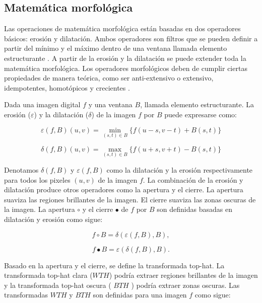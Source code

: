 \subsection{Matem\'atica morfol\'ogica}

Las operaciones de matemática morfológica están basadas en dos operadores básicos: erosión y dilatación. Ambos operadores son filtros que se pueden definir a partir del m\'inimo y el m\'aximo dentro de una ventana llamada elemento estructurante \cite{serra1986introduction}. A partir de la erosi\'on y la dilataci\'on se puede extender toda la matem\'atica morfol\'ogica. Los operadores morfol\'ogicos deben de cumplir ciertas propiedades de manera teórica, como ser anti-extensivo o extensivo, idempotentes, homot\'opicos y crecientes \cite{serra1986introduction}.

Dada una imagen digital $f$ y una ventana $B$, llamada elemento estructurante. La erosi\'on ($\varepsilon$) y la dilataci\'on ($\delta$) de la imagen $f$ por $B$ puede expresarse como:

\begin{equation}
\varepsilon(f,B)(u,v)  = \min_{(s,t) \in B} \{f(u-s,v-t) + B(s,t) \}
\end{equation}

\begin{equation}
\delta(f,B)(u,v)  =  \max_{(s,t) \in B} \{f(u+s,v+t) - B(s,t) \}
\end{equation}

Denotamos $\delta(f,B)$ y $\varepsilon(f,B)$ como la dilataci\'on y la erosi\'on respectivamente para todos los pixeles $(u,v)$ de la imagen $f$. La combinación de la erosión y dilatación produce otros operadores como la apertura y el cierre. La apertura suaviza las regiones brillantes de la imagen. El cierre suaviza las zonas oscuras de la imagen. La apertura $\circ$ y el cierre $\bullet$ de $f$ por $B$ son definidas basadas en dilataci\'on y erosi\'on como sigue:

\begin{equation}
f\circ B = \delta(\varepsilon(f,B),B),
\end{equation}

\begin{equation}
f\bullet B = \varepsilon(\delta(f,B),B).
\end{equation}

Basado en la apertura y el cierre, se define la transformada top-hat. La transformada top-hat clara ($WTH$) podría extraer regiones brillantes de la imagen y la transformada top-hat oscura ( $BTH$ )
podría extraer zonas oscuras. Las transformadas $WTH$ y $BTH$ son definidas para una imagen $f$ como sigue:


